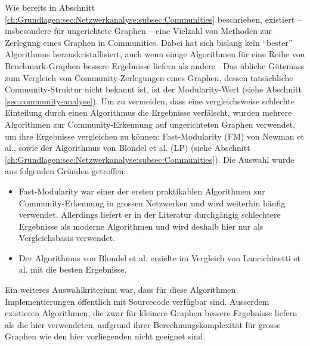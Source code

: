Wie bereits in Abschnitt
\ref{ch:Grundlagen:sec:Netzwerkanalyse:subsec:Communities}
beschrieben, existiert -- insbesondere f\"ur ungerichtete Graphen --
eine Vielzahl von Methoden zur Zerlegung eines Graphen in
Communities. Dabei hat sich bislang kein ``bester'' Algorithmus
herauskristallisiert, auch wenn einige Algorithmen f\"ur eine Reihe
von Benchmark-Graphen bessere Ergebnisse liefern als andere
\cite{Lancichinetti2009}. Das \"ubliche G\"utemass zum Vergleich von
Community-Zerlegungen eines Graphen, dessen tats\"achliche
Community-Struktur nicht bekannt ist, ist der Modularity-Wert (siehe
Abschnitt \ref{sec:community-analyse}).  Um zu vermeiden, dass eine
vergleichsweise schlechte Einteilung durch einen Algorithmus die
Ergebnisse verf\"alscht, wurden mehrere Algorithmen zur
Community-Erkennung auf ungerichteten Graphen verwendet, um ihre
Ergebnisse vergleichen zu k\"onnen: Fast-Modularity (FM) von Newman et
al., sowie der Algorithmus von Blondel et al. (LP) (siehe Abschnitt
\ref{ch:Grundlagen:sec:Netzwerkanalyse:subsec:Communities}). Die
Auswahl wurde aus folgenden Gr\"unden getroffen:

\begin{itemize}
\item Fast-Modularity war einer der ersten praktikablen Algorithmen
  zur Community-Erkennung in grossen Netzwerken und wird weiterhin
  h\"aufig verwendet. Allerdings liefert er in der Literatur
  durchg\"angig schlechtere Ergebnisse als moderne Algorithmen
  \cite{Fortunato2010} und wird deshalb hier nur als Vergleichsbasis
  verwendet.
\item Der Algorithmus von Blondel et al. erzielte im Vergleich von
  Lancichinetti et al. \cite{Lancichinetti2009} mit die besten Ergebnisse.
\end{itemize}

Ein weiteres Auswahlkriterium war, dass f\"ur diese Algorithmen
Implementierungen \"offentlich mit Sourcecode verf\"ugbar
sind. Ausserdem existieren Algorithmen, die zwar f\"ur kleinere
Graphen bessere Ergebnisse liefern als die hier verwendeten, aufgrund
ihrer Berechnungskomplexit\"at f\"ur grosse Graphen wie den hier
vorliegenden nicht geeignet sind.

